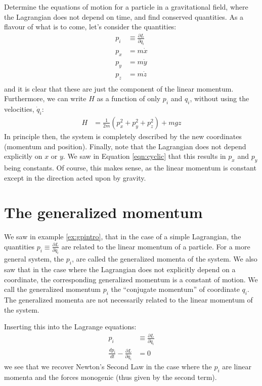 \begin{example}{0pt}{Determine the equations of motion for a particle in a gravitational field, where the Lagrangian does not depend on time, and find conserved quantities.}{}
As a flavour of what is to come, let's consider the quantities:
\begin{align*}
p_i&\equiv \frac{\partial L}{\partial \dot{q}_i}\\
p_x&=m\dot{x}\\
p_y&=m\dot{y}\\
p_z&=m\dot{z}\\
\end{align*}
and it is clear that these are just the component of the linear momentum. Furthermore, we can write $H$ as a function of only $p_i$ and $q_i$, without using the velocities, $\dot{q}_i$:
\begin{align*}
H&=\frac{1}{2m}(p_x^2+p_y^2+p_z^2)+mgz
\end{align*}
In principle then, the system is completely described by the new coordinates (momentum and position). Finally, note that the Lagrangian does not depend explicitly on $x$ or $y$. We saw in Equation \ref{eqn:cyclic} that this results in $p_x$ and $p_y$ being constants. Of course, this makes sense, as the linear momentum is constant except in the direction acted upon by gravity.
\label{ex:gpintro}
\end{example}

\section{The generalized momentum}
We saw in example \ref{ex:gpintro}, that in the case of a simple Lagrangian, the quantities $p_i\equiv\frac{\partial L}{\partial \dot{q}_i}$ are related to the linear momentum of a particle. For a more general system, the $p_i$, are called the generalized momenta of the system. We also saw that in the case where the Lagrangian does not explicitly depend on a coordinate, the corresponding generalized momentum is a constant of motion. We call the generalized momentum $p_i$ the ``conjugate momentum'' of coordinate $q_i$. The generalized momenta are not necessarily related to the linear momentum of the system.

Inserting this into the Lagrange equations:
\begin{align}
p_i&\equiv\frac{\partial L}{\partial \dot{q}_i}\\
\frac{dp_i}{dt}-\frac{\partial L}{\partial q_i}&=0
\end{align}
we see that we recover Newton's Second Law in the case where the $p_i$ are linear momenta and the forces monogenic (thus given by the second term).

